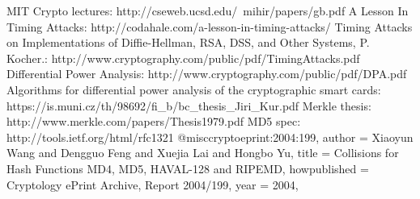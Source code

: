 \documentclass[a4paper,12pt]{article}
\begin{document}
MIT Crypto lectures: http://cseweb.ucsd.edu/~mihir/papers/gb.pdf
A Lesson In Timing Attacks: http://codahale.com/a-lesson-in-timing-attacks/
Timing Attacks on Implementations of Diffie-Hellman, RSA, DSS, and Other Systems, P. Kocher.: http://www.cryptography.com/public/pdf/TimingAttacks.pdf
Differential Power Analysis: http://www.cryptography.com/public/pdf/DPA.pdf
Algorithms for differential power analysis of the cryptographic smart cards: https://is.muni.cz/th/98692/fi\_b/bc\_thesis\_Jiri\_Kur.pdf
Merkle thesis: http://www.merkle.com/papers/Thesis1979.pdf 
MD5 spec: http://tools.ietf.org/html/rfc1321 
@misc{cryptoeprint:2004:199,
    author = {Xiaoyun Wang  and Dengguo Feng and Xuejia Lai and Hongbo Yu},
    title = {Collisions for Hash Functions MD4, MD5, HAVAL-128 and RIPEMD},
    howpublished = {Cryptology ePrint Archive, Report 2004/199},
    year = {2004},
}


\end{document}
